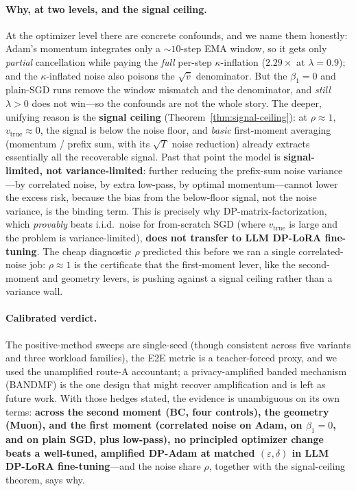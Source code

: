 \documentclass[11pt]{article}
\theoremstyle{plain}
\theoremstyle{definition}
\theoremstyle{remark}
\begin{document}
\paragraph{Why, at two levels, and the signal ceiling.}
At the optimizer level there are concrete confounds, and we name them honestly: Adam's momentum
integrates only a $\sim10$-step EMA window, so it gets only \emph{partial} cancellation while paying
the \emph{full} per-step $\kappa$-inflation ($2.29\times$ at $\lambda{=}0.9$); and the $\kappa$-inflated
noise also poisons the $\sqrt{\hat v}$ denominator. But the $\beta_1{=}0$ and plain-SGD runs remove the
window mismatch and the denominator, and \emph{still} $\lambda>0$ does not win---so the confounds are
not the whole story. The deeper, unifying reason is the \textbf{signal ceiling}
(Theorem~\ref{thm:signal-ceiling}): at $\rho\approx1$, $v_{\mathrm{true}}\approx0$, the signal is below the
noise floor, and \emph{basic} first-moment averaging (momentum / prefix sum, with its $\sqrt{T}$ noise
reduction) already extracts essentially all the recoverable signal. Past that point the model is
\textbf{signal-limited, not variance-limited}: further reducing the prefix-sum noise variance---by
correlated noise, by extra low-pass, by optimal momentum---cannot lower the excess risk, because the
bias from the below-floor signal, not the noise variance, is the binding term. This is precisely why
DP-matrix-factorization, which \emph{provably} beats i.i.d.\ noise for from-scratch SGD (where
$v_{\mathrm{true}}$ is large and the problem is variance-limited), \textbf{does not transfer to LLM
DP-LoRA fine-tuning}. The cheap diagnostic $\rho$ predicted this before we ran a single correlated-noise
job: $\rho\approx1$ is the certificate that the first-moment lever, like the second-moment and geometry
levers, is pushing against a signal ceiling rather than a variance wall.

\paragraph{Calibrated verdict.}
The positive-method sweeps are single-seed (though consistent across five variants and three workload
families), the E2E metric is a teacher-forced proxy, and we used the unamplified route-A accountant; a
privacy-amplified banded mechanism (BANDMF) is the one design that might recover amplification and is
left as future work. With those hedges stated, the evidence is unambiguous on its own terms:
\textbf{across the second moment (BC, four controls), the geometry (Muon), and the first moment
(correlated noise on Adam, on $\beta_1{=}0$, and on plain SGD, plus low-pass), no principled optimizer
change beats a well-tuned, amplified DP-Adam at matched $(\varepsilon,\delta)$ in LLM DP-LoRA
fine-tuning}---and the noise share $\rho$, together with the signal-ceiling theorem, says why.
\end{document}
